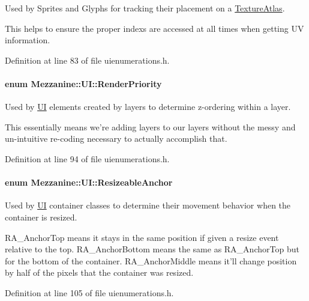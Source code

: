 Used by Sprites and Glyphs for tracking their placement on a \hyperlink{classMezzanine_1_1UI_1_1TextureAtlas}{TextureAtlas}. 

This helps to ensure the proper indexs are accessed at all times when getting UV information. 

Definition at line 83 of file uienumerations.h.

\hypertarget{namespaceMezzanine_1_1UI_ac4c753eb6b5d66350a243acc9ce54130}{
\paragraph[{RenderPriority}]{\setlength{\rightskip}{0pt plus 5cm}enum {\bf Mezzanine::UI::RenderPriority}}\hfill}
\label{namespaceMezzanine_1_1UI_ac4c753eb6b5d66350a243acc9ce54130}


Used by \hyperlink{namespaceMezzanine_1_1UI}{UI} elements created by layers to determine z-\/ordering within a layer. 

This essentially means we're adding layers to our layers without the messy and un-\/intuitive re-\/coding necessary to actually accomplish that. 

Definition at line 94 of file uienumerations.h.

\hypertarget{namespaceMezzanine_1_1UI_a1c571649db3aa98f4e16285b5b754928}{
\paragraph[{ResizeableAnchor}]{\setlength{\rightskip}{0pt plus 5cm}enum {\bf Mezzanine::UI::ResizeableAnchor}}\hfill}
\label{namespaceMezzanine_1_1UI_a1c571649db3aa98f4e16285b5b754928}


Used by \hyperlink{namespaceMezzanine_1_1UI}{UI} container classes to determine their movement behavior when the container is resized. 

RA\_\-AnchorTop means it stays in the same position if given a resize event relative to the top. RA\_\-AnchorBottom means the same as RA\_\-AnchorTop but for the bottom of the container. RA\_\-AnchorMiddle means it'll change position by half of the pixels that the container was resized. 

Definition at line 105 of file uienumerations.h.

